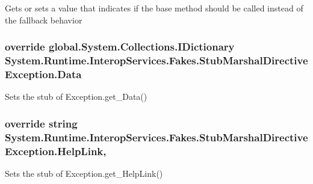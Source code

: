 Gets or sets a value that indicates if the base method should be called instead of the fallback behavior

\hypertarget{class_system_1_1_runtime_1_1_interop_services_1_1_fakes_1_1_stub_marshal_directive_exception_afcb90e618b35879275f1081f1b3197cd}{
\subsubsection[{Data}]{\setlength{\rightskip}{0pt plus 5cm}override global.\-System.\-Collections.\-I\-Dictionary System.\-Runtime.\-Interop\-Services.\-Fakes.\-Stub\-Marshal\-Directive\-Exception.\-Data\hspace{0.3cm}{\ttfamily [get]}}}\label{class_system_1_1_runtime_1_1_interop_services_1_1_fakes_1_1_stub_marshal_directive_exception_afcb90e618b35879275f1081f1b3197cd}


Sets the stub of Exception.\-get\-\_\-\-Data()

\hypertarget{class_system_1_1_runtime_1_1_interop_services_1_1_fakes_1_1_stub_marshal_directive_exception_a562ff8eaefad108fb749b15fe7926b5b}{
\subsubsection[{Help\-Link}]{\setlength{\rightskip}{0pt plus 5cm}override string System.\-Runtime.\-Interop\-Services.\-Fakes.\-Stub\-Marshal\-Directive\-Exception.\-Help\-Link\hspace{0.3cm}{\ttfamily [get]}, {\ttfamily [set]}}}\label{class_system_1_1_runtime_1_1_interop_services_1_1_fakes_1_1_stub_marshal_directive_exception_a562ff8eaefad108fb749b15fe7926b5b}


Sets the stub of Exception.\-get\-\_\-\-Help\-Link()

